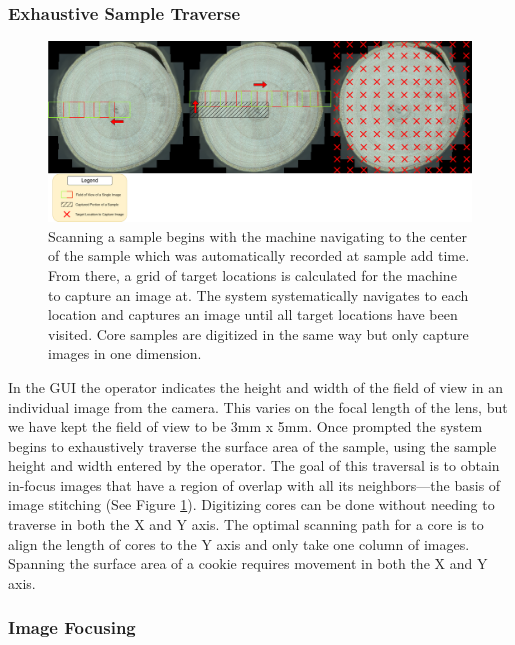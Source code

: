 \documentclass[a4paper,12pt]{article}
\begin{document}
\subsubsection{Exhaustive Sample Traverse}  
\begin{figure}
  \centering
  \includegraphics[height=0.4\linewidth]{../content/cookie_traverse.png}
  \caption{Scanning a sample begins with the machine navigating to the center of the sample which was automatically recorded at sample add time. From there, a grid of target locations is calculated for the machine to capture an image at. The system systematically navigates to each location and captures an image until all target locations have been visited. Core samples are digitized in the same way but only capture images in one dimension.}
  \label{fig:cookie_traverse}
\end{figure}

In the GUI the operator indicates the height and width of the field of view in an individual image from the camera. 
This varies on the focal length of the lens, but we have kept the field of view to be 3mm x 5mm. 
Once prompted the system begins to exhaustively traverse the surface area of the sample, using the sample height and width entered by the operator.  
The goal of this traversal is to obtain in-focus images that have a region of overlap with all its neighbors---the basis of image stitching (See Figure \ref{fig:cookie_traverse}). 
Digitizing cores can be done without needing to traverse in both the X and Y axis. 
The optimal scanning path for a core is to align the length of cores to the Y axis and only take one column of images.
Spanning the surface area of a cookie requires movement in both the X and Y axis.

\subsubsection{Image Focusing}
\end{document}

